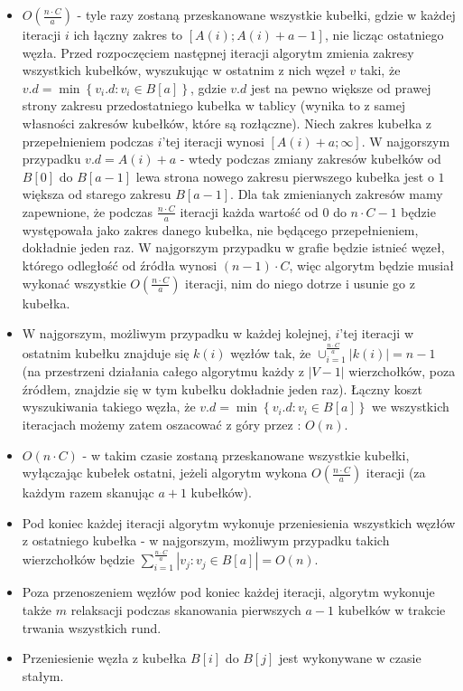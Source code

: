 \begin{itemize}
\item $ O \left( \frac{n \cdot C}{a} \right) $ - tyle razy zostaną przeskanowane wszystkie kubełki, gdzie w każdej iteracji $i$ ich łączny zakres to $ \left [ A \left( i \right) ; A \left( i \right) + a - 1 \right] $, nie licząc ostatniego węzła. Przed rozpoczęciem następnej iteracji algorytm zmienia zakresy wszystkich kubełków, wyszukując w ostatnim z nich węzeł $v$ taki, że $ v.d = \min \left\{ v_{i}.d : v_{i} \in B \left[ a \right] \right\}$, gdzie $v.d$ jest na pewno większe od prawej strony zakresu przedostatniego kubełka w tablicy (wynika to z samej własności zakresów kubełków, które są rozłączne). Niech zakres kubełka z przepełnieniem podczas $i$'tej iteracji wynosi $ \left [ A \left( i \right) + a ; \infty \right] $.  W najgorszym przypadku $v.d = A \left( i \right) + a$ - wtedy podczas zmiany zakresów kubełków od $B \left[ 0 \right]$ do $B \left[ a -1 \right]$ lewa strona nowego zakresu pierwszego kubełka jest o $1$ większa od starego zakresu $B \left[ a -1 \right]$. Dla tak zmienianych zakresów mamy zapewnione, że podczas  $\frac{n \cdot C}{a} $ iteracji każda wartość od $0$ do $n \cdot C - 1 $ będzie występowała jako zakres danego kubełka, nie będącego przepełnieniem, dokładnie jeden raz. W najgorszym przypadku w grafie będzie istnieć węzeł, którego odległość od źródła wynosi $ \left( n - 1 \right) \cdot C$, więc algorytm będzie musiał wykonać wszystkie $O \left( \frac{n \cdot C}{a} \right)$ iteracji, nim do niego dotrze i usunie go z kubełka.
\item W najgorszym, możliwym przypadku w każdej kolejnej, $i$'tej iteracji w ostatnim kubełku znajduje się $k \left( i \right) $ węzłów tak, że $\cup _{i = 1}^{\frac{n \cdot C}{a}} \left| k \left( i \right) \right| = n - 1 $ (na przestrzeni działania całego algorytmu każdy z $\left| V - 1 \right|$ wierzchołków, poza źródłem, znajdzie się w tym kubełku dokładnie jeden raz). Łączny koszt wyszukiwania takiego węzła, że $ v.d = \min \left\{ v_{i}.d : v_{i} \in B \left[ a \right] \right\}$ we wszystkich iteracjach możemy zatem oszacować z góry przez : $ O \left( n \right)$.
\item $ O \left( n \cdot C \right)$ - w takim czasie zostaną przeskanowane wszystkie kubełki, wyłączając kubełek ostatni, jeżeli algorytm wykona $ O \left( \frac{n \cdot C}{a} \right) $ iteracji (za każdym razem skanując $a+1$ kubełków).
\item Pod koniec każdej iteracji algorytm wykonuje przeniesienia wszystkich węzłów z ostatniego kubełka - w najgorszym, możliwym przypadku takich wierzchołków będzie $ \sum_{i=1}^{\frac{n \cdot C}{a}} \left| v_{j} : v_{j} \in B \left[ a \right] \right| = O \left( n \right)$.
\item Poza przenoszeniem węzłów pod koniec każdej iteracji, algorytm wykonuje także $m$ relaksacji podczas skanowania pierwszych $a-1$ kubełków w trakcie trwania wszystkich rund.
\item Przeniesienie węzła z kubełka $ B \left[ i \right] $ do $ B \left[ j \right]$ jest wykonywane w czasie stałym.
\end{itemize}

